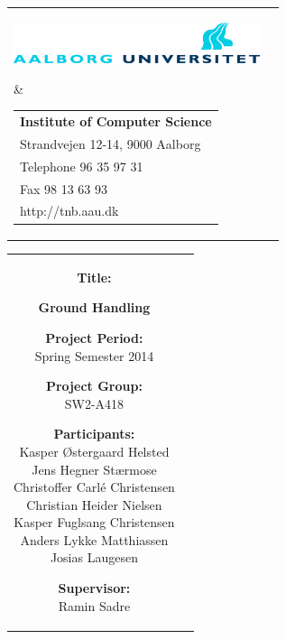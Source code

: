 \thispagestyle{empty}
\begin{titlepage}
	\setlength{\textwidth}{15cm}
	\noindent
	\begin{nopagebreak}
		{\samepage 
			\begin{tabular}{lr}
				\parbox{0.5\textwidth}{\raisebox{11mm}
					{\includegraphics[height=1.2cm]{Grafik/aauLogoDa}}
				} &
				\parbox{0.5\textwidth}{
					\small
					\begin{tabular}{l}
						{\sf\small \textbf{Institute of Computer Science}}\\
						{\sf\small Strandvejen 12-14, 9000 Aalborg} \\
						{\sf\small Telephone 96 35 97 31} \\
						{\sf\small Fax 98 13 63 93} \\
						{\sf\small http://tnb.aau.dk}
					\end{tabular}
				}
			\end{tabular}
			
			\noindent
			\begin{tabular}{cc}
				\parbox{7cm}{
					\begin{description}
			
						\item {\bf Title:} 
			
							\textbf{Ground Handling}\\
						\item {\bf Project Period:}\\
			  				Spring Semester 2014\\
			 				\hspace{4cm}
						\item {\bf Project Group:}\\
							SW2-A418\\
			  				\hspace{4cm}
						\item {\bf Participants:}\\
							Kasper Østergaard Helsted\\
                            Jens Hegner Stærmose\\
                            Christoffer Carlé Christensen\\
                            Christian Heider Nielsen\\
                            Kasper Fuglsang Christensen\\
                            Anders Lykke Matthiassen\\
                            Josias Laugesen\\
							\hspace{2cm}
						\item {\bf Supervisor:}\\
							Ramin Sadre\\


\end{description}}
\end{tabular}}
\end{nopagebreak}
\end{titlepage}
